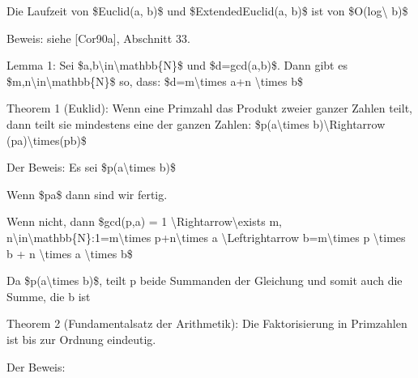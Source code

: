 \documentclass[a4paper]{article}
\begin{document}
\begin{multicols}{3}
\begin{itemize*}
\begin{itemize*}
                  \item Die Laufzeit von \$Euclid(a, b)\$ und \$ExtendedEuclid(a, b)\$ ist von \$O(log\textbackslash{} b)\$
                  \begin{itemize*} \item Beweis: siehe {[}Cor90a{]}, Abschnitt 33. \end{itemize*}
                  \item Lemma 1: Sei \$a,b\textbackslash in\textbackslash mathbb\{N\}\$ und \$d=gcd(a,b)\$. Dann gibt es \$m,n\textbackslash in\textbackslash mathbb\{N\}\$ so, dass: \$d=m\textbackslash times a+n \textbackslash times b\$
            \end{itemize*}
            \item Theorem 1 (Euklid): Wenn eine Primzahl das Produkt zweier ganzer
            Zahlen teilt, dann teilt sie mindestens eine der ganzen Zahlen:
            \$p\textbar(a\textbackslash times b)\textbackslash Rightarrow
            (p\textbar a)\textbackslash times(p\textbar b)\$
            \begin{itemize*}
                  \item Der Beweis: Es sei \$p\textbar(a\textbackslash times b)\$
                  \begin{itemize*} \item Wenn \$p\textbar a\$ dann sind wir fertig. \item Wenn nicht, dann \$gcd(p,a) = 1 \textbackslash Rightarrow\textbackslash exists m, n\textbackslash in\textbackslash mathbb\{N\}:1=m\textbackslash times p+n\textbackslash times a \textbackslash Leftrightarrow b=m\textbackslash times p \textbackslash times b + n \textbackslash times a \textbackslash times b\$ \item Da \$p\textbar(a\textbackslash times b)\$, teilt p beide Summanden der Gleichung und somit auch die Summe, die b ist \end{itemize*}
            \end{itemize*}
            \item Theorem 2 (Fundamentalsatz der Arithmetik): Die Faktorisierung in
            Primzahlen ist bis zur Ordnung eindeutig.
            \begin{itemize*}
                  \item Der Beweis:

\end{itemize*}
\end{itemize*}
\end{multicols}
\end{document}
